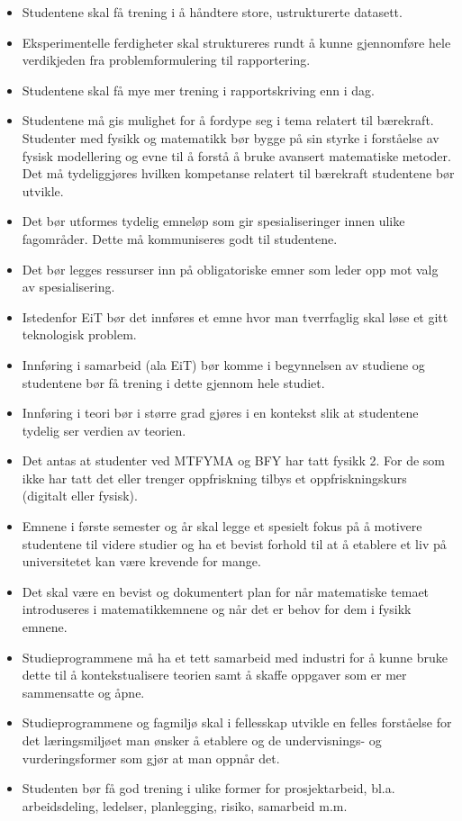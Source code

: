\begin{itemize}
	\item Studentene skal få trening i å håndtere store, ustrukturerte datasett.
	\item Eksperimentelle ferdigheter skal struktureres rundt å kunne gjennomføre hele verdikjeden fra problemformulering til rapportering.
	\item Studentene skal få mye mer trening i rapportskriving enn i dag.
	\item Studentene må gis mulighet for å fordype seg i tema relatert til bærekraft. Studenter med fysikk og matematikk bør bygge på sin styrke i forståelse av fysisk modellering og evne til å forstå å bruke avansert matematiske metoder. Det må tydeliggjøres hvilken kompetanse relatert til bærekraft studentene bør utvikle.
	\item Det bør utformes tydelig emneløp som gir spesialiseringer innen ulike fagområder. Dette må kommuniseres godt til studentene.
	\item Det bør legges ressurser inn på obligatoriske emner som leder opp mot valg av spesialisering.
	\item Istedenfor EiT bør det innføres et emne hvor man tverrfaglig skal løse et gitt teknologisk problem.
	\item Innføring i samarbeid (ala EiT) bør komme i begynnelsen av studiene og studentene bør få trening i dette gjennom hele studiet.
	\item Innføring i teori bør i større grad gjøres i en kontekst slik at studentene tydelig ser verdien av teorien.
	\item Det antas at studenter ved MTFYMA og BFY har tatt fysikk 2. For de som ikke har tatt det eller trenger oppfriskning tilbys et oppfriskningskurs (digitalt eller fysisk).
	\item Emnene i første semester og år skal legge et spesielt fokus på å motivere studentene til videre studier og ha et bevist forhold til at å etablere et liv på universitetet kan være krevende for mange.
	\item Det skal være en bevist og dokumentert plan for når matematiske temaet introduseres i matematikkemnene og når det er behov for dem i fysikk emnene.
	\item Studieprogrammene må ha et tett samarbeid med industri for å kunne bruke dette til å kontekstualisere teorien samt å skaffe oppgaver som er mer sammensatte og åpne.
	\item Studieprogrammene og fagmiljø skal i fellesskap utvikle en felles forståelse for det læringsmiljøet man ønsker å etablere og de undervisnings- og vurderingsformer som gjør at man oppnår det.
	\item Studenten bør få god trening i ulike former for prosjektarbeid, bl.a. arbeidsdeling, ledelser, planlegging, risiko, samarbeid m.m.
\end{itemize}

